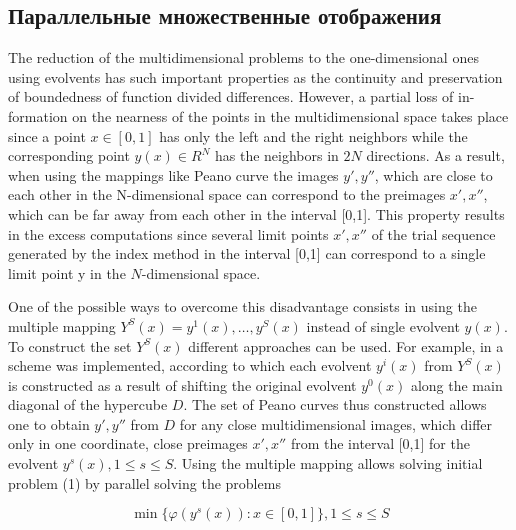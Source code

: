 \documentclass[runningheads]{llncs}
\begin{document}
\subsection{Параллельные множественные отображения}
\label{sec:parallel_evolvents}
The reduction of the multidimensional problems to the one-dimensional ones using evolvents has such important properties as the continuity and preservation of boundedness of function divided differences. However, a partial loss of in-formation on the nearness of the points in the multidimensional space takes place since a point \mbox{\(x\in[0,1]\)} has only the left and the right neighbors while the corresponding point  \mbox{\(y(x)\in R^N\)} has the neighbors in \(2N\) directions. As a result, when using the mappings like Peano curve the images \(y',y''\), which are close to each other in the N-dimensional space can correspond to the preimages \(x',x''\), which can be far away from each other in the interval [0,1]. This property results in the excess computations since several limit points \(x',x''\) of the trial sequence generated by the index method in the interval [0,1] can correspond to a single limit point y in the \(N\)-dimensional space.
\par
One of the possible ways to overcome this disadvantage consists in using the multiple mapping \(Y^S (x)={y^1 (x),…,y^S (x)}\) instead of single evolvent \(y(x)\). To construct the set \(Y^S (x)\) different approaches can be used. For example, in \cite{strSergGO} a scheme was implemented, according to which each evolvent \(y^i (x)\) from \(Y^S (x)\) is constructed as a result of shifting the original evolvent \(y^0 (x)\) along the main diagonal of the hypercube \(D\). The set of Peano curves thus constructed allows one to obtain \(y',y''\) from \(D\) for any close multidimensional images, which differ only in one coordinate, close preimages \(x',x''\) from the interval [0,1] for the evolvent \(y^s (x),1≤s≤S\).
Using the multiple mapping allows solving initial problem (1) by parallel solving the problems
\par

\[
\min\{\varphi(y^s(x)):x\in [0,1]\}, 1≤s≤S
\]
\end{document}
